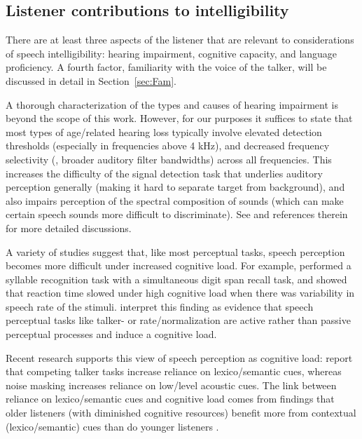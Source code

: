 \subsection{Listener contributions to intelligibility\label{sec:Listener}}
There are at least three aspects of the listener that are relevant to considerations of speech intelligibility: hearing impairment, cognitive capacity, and language proficiency.  A fourth factor, familiarity with the voice of the talker, will be discussed in detail in Section~\ref{sec:Fam}.  

A thorough characterization of the types and causes of hearing impairment is beyond the scope of this work.\footnotemark{}  However, for our purposes it suffices to state that most types of age\-/related hearing loss typically involve elevated detection thresholds (especially in frequencies above 4 kHz), and decreased frequency selectivity (\ie, broader auditory filter bandwidths) across all frequencies.  This increases the difficulty of the signal detection task that underlies auditory perception generally (making it hard to separate target from background), and also impairs perception of the spectral composition of sounds (which can make certain speech sounds more difficult to discriminate).  See \citet[117–119]{Moore2008} and references therein for more detailed discussions.


A variety of studies suggest that, like most perceptual tasks, speech perception becomes more difficult under increased cognitive load.  For example, \citet{FrancisNusbaum1996} performed a syllable recognition task with a simultaneous digit span recall task, and showed that reaction time slowed under high cognitive load when there was variability in speech rate of the stimuli.  \citeauthor*{FrancisNusbaum1996} interpret this finding as evidence that speech perceptual tasks like talker- or rate\-/normalization are active rather than passive perceptual processes and induce a cognitive load.  

Recent research supports this view of speech perception as cognitive load: \citet{MattysEtAl2009} report that competing talker tasks increase reliance on lexico\-/semantic cues, whereas noise masking increases reliance on low\-/level acoustic cues.  The link between reliance on lexico\-/semantic cues and cognitive load comes from findings that older listeners (with diminished cognitive resources) benefit more from contextual (lexico\-/semantic) cues than do younger listeners \citep{PichoraFullerEtAl1995, SommersDanielson1999}.  %

